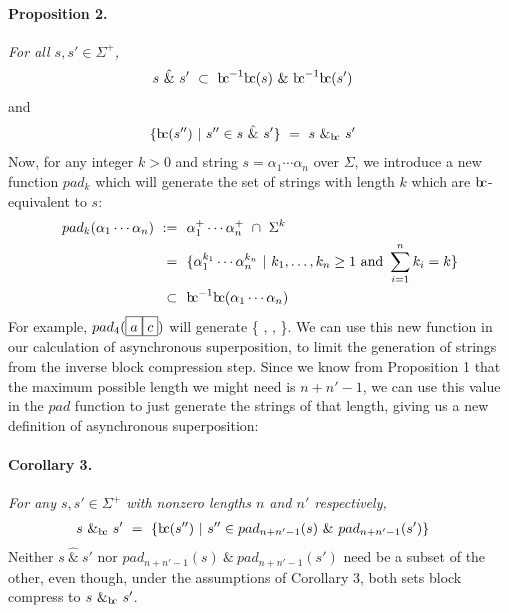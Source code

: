 \documentclass[a4paper,11pt]{article}
\newcommand{\bc}{{\rm b\!c}}
\newcommand{\vph}[1]{\vphantom{#1}}
\begin{document}
\paragraph{Proposition 2.} {\sl For all $s,s'\in \Sigma^+$,}
\begin{align*}
s\ \hat{\&}\ s' & \ \subset\ \bc^{-1}\bc(s)\ \&\ \bc^{-1}\bc(s')
\end{align*}
and
\begin{align*}
\{\bc(s'')\ | \ s''\in s\ \hat{\&}\ s'\}
& \ = \   s\ \&_{\bc}\ s'
\end{align*}
Now, for any integer $k > 0$ and string $s = \alpha_1\cdots\alpha_n$ over 
$\Sigma$, we introduce a new 
function 
$pad_k$ which will generate the set of strings with length $k$ which are 
$\bc$-equivalent to $s$:
\begin{align*}
pad_k(\alpha_1\cdots\alpha_n)~:=&~~\alpha_1^+\cdots\alpha_n^+\ \cap\ \Sigma^k \\
=&~~\{
\alpha_1^{k_1}\cdots\alpha_n^{k_n}\ | \
k_1,\ldots,k_n\geq 1
\mbox{ and } \sum_{i=1}^n k_i = k \}\\
\subset&~~\bc^{-1}\bc(\alpha_1\cdots\alpha_n)
\end{align*}
For example, $pad_{4}(\fbox{$a\vph{'}$}\fbox{$c\vph{'}$})$ will 
generate \{
\fbox{$a\vph{'}$}\fbox{$a\vph{'}$}\fbox{$a\vph{'}$}\fbox{$c\vph{'}$}, 
\fbox{$a\vph{'}$}\fbox{$a\vph{'}$}\fbox{$c\vph{'}$}\fbox{$c\vph{'}$}, 
\fbox{$a\vph{'}$}\fbox{$c\vph{'}$}\fbox{$c\vph{'}$}\fbox{$c\vph{'}$} \}. We 
can use this new function in our 
calculation of asynchronous superposition, to limit the generation of strings 
from the inverse block compression step. Since we know from Proposition 1 that 
the maximum possible 
length we might need is $n+n'-1$, we can use this value in the $pad$ function 
to just 
generate the strings of that length, giving us a new definition of asynchronous 
superposition:
\paragraph{Corollary 3.} {\sl For any $s,s'\in \Sigma^+$
	with nonzero lengths $n$ and $n'$ respectively,}
\begin{align*}
s \ \&_{\bc} \ s' & \ = \
\{\bc(s'')\ | \ s''\in pad_{n+n'-1}(s)\ \& \ pad_{n+n'-1}(s')\}
\end{align*}
Neither $s\ \hat{\&}\ s'$ nor $pad_{n+n'-1}(s)\ \& \ pad_{n+n'-1}(s')$
need be a subset of the other, even though,
under the assumptions of Corollary 3, 
both sets block compress to $s \ \&_{\bc} \ s'$.
\end{document}
